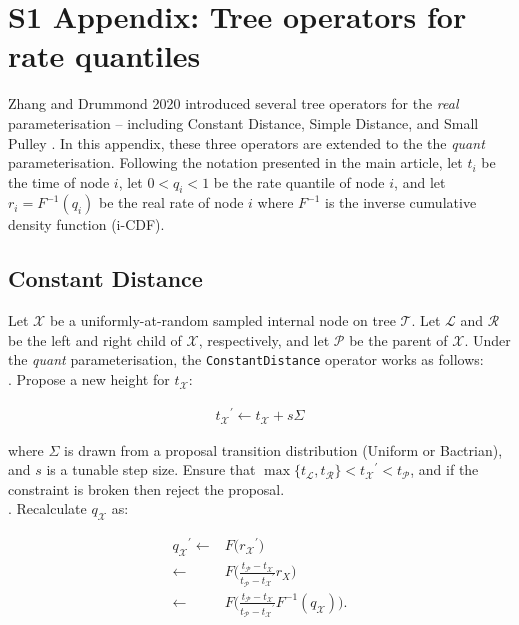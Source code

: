 \documentclass[12pt]{article}
\begin{document}
\section*{S1 Appendix: Tree operators for rate quantiles}




Zhang and Drummond 2020 introduced several tree operators for the \textit{real} parameterisation -- including Constant Distance, Simple Distance, and Small Pulley \cite{zhang2020improving}.
In this appendix, these three operators are extended to the  the \textit{quant} parameterisation.
Following the notation presented in the main article, let $t_i$ be the time of node $i$, let $0 < q_i < 1$ be the rate quantile of node $i$, and let $r_i = F^{-1}(q_i)$ be the real rate of node $i$ where $F^{-1}$ is the inverse cumulative density function (i-CDF).








\subsection*{Constant Distance}



Let $\mathcal{X}$ be a uniformly-at-random sampled internal node on tree $\mathcal{T}$. Let $\mathcal{L}$ and $\mathcal{R}$ be the left and right child of $\mathcal{X}$, respectively, and let $\mathcal{P}$ be the parent of $\mathcal{X}$. 
Under the \textit{quant} parameterisation, the \texttt{ConstantDistance} operator works as follows: \\


. Propose a new height for $t_\mathcal{X}$:

\begin{align}
	{t_\mathcal{X}}^\prime \leftarrow t_\mathcal{X} + s\Sigma
\end{align}

where $\Sigma$ is drawn from a proposal transition distribution (Uniform or Bactrian), and $s$ is a tunable step size. Ensure that $\max\{t_\mathcal{L}, t_\mathcal{R} \} < {t_\mathcal{X}}^\prime < t_\mathcal{P}$, and if the constraint is broken then reject the proposal.  \\


. Recalculate $q_\mathcal{X}$ as:



\begin{align}
	{q_\mathcal{X}}^\prime  \leftarrow & F\Big({r_\mathcal{X}}^\prime \Big) \nonumber\\
				\leftarrow & F\Big(\frac{t_\mathcal{P} - t_\mathcal{X}}{t_\mathcal{P} - {t_\mathcal{X}}^\prime} r_X \Big)\nonumber \\
				\leftarrow & F\Big(\frac{t_\mathcal{P} - t_\mathcal{X}}{t_\mathcal{P} - {t_\mathcal{X}}^\prime} F^{-1}(q_\mathcal{X}) \Big).
\end{align}
\end{document}
